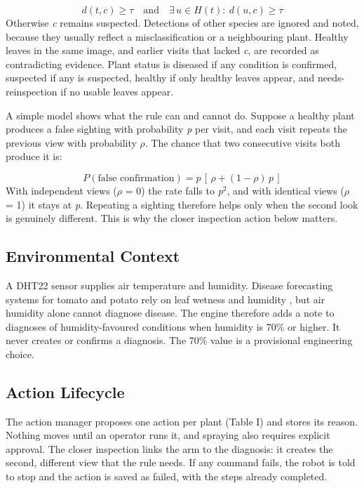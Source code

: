 \documentclass[conference]{IEEEtran}
\begin{document}
\begin{equation}
d(t,c) \geq \tau \quad \text{and} \quad \exists\, u \in H(t):\ d(u,c) \geq \tau
\end{equation}
Otherwise \emph{c} remains suspected. Detections of other species are ignored and noted, because they usually reflect a misclassification or a neighbouring plant. Healthy leaves in the same image, and earlier visits that lacked \emph{c}, are recorded as contradicting evidence. Plant status is diseased if any condition is confirmed, suspected if any is suspected, healthy if only healthy leaves appear, and needs-reinspection if no usable leaves appear.

A simple model shows what the rule can and cannot do. Suppose a healthy plant produces a false sighting with probability \emph{p} per visit, and each visit repeats the previous view with probability $\rho$. The chance that two consecutive visits both produce it is:

\begin{equation}
P(\text{false confirmation}) = p\,[\,\rho + (1-\rho)\,p\,]
\end{equation}
With independent views ($\rho$ = 0) the rate falls to \emph{p}$^2$, and with identical views ($\rho$ = 1) it stays at \emph{p}. Repeating a sighting therefore helps only when the second look is genuinely different. This is why the closer inspection action below matters.

\subsection{Environmental Context}
A DHT22 sensor supplies air temperature and humidity. Disease forecasting systems for tomato and potato rely on leaf wetness and humidity \cite{rutgers}, but air humidity alone cannot diagnose disease. The engine therefore adds a note to diagnoses of humidity-favoured conditions when humidity is 70\% or higher. It never creates or confirms a diagnosis. The 70\% value is a provisional engineering choice.

\subsection{Action Lifecycle}
The action manager proposes one action per plant (Table I) and stores its reason. Nothing moves until an operator runs it, and spraying also requires explicit approval. The closer inspection links the arm to the diagnosis: it creates the second, different view that the rule needs. If any command fails, the robot is told to stop and the action is saved as failed, with the steps already completed.
\end{document}
